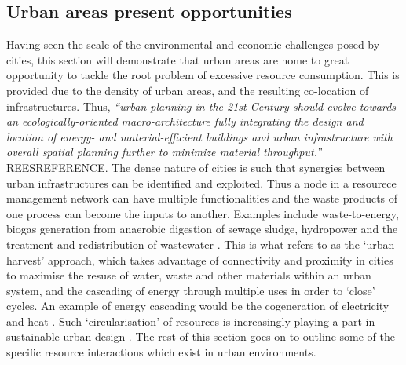 \subsection{Urban areas present opportunities}
Having seen the scale of the environmental and economic challenges posed by cities, this section will demonstrate that urban areas are home to great opportunity to tackle the root problem of excessive resource consumption. This is provided due to the density of urban areas, and the resulting co-location of infrastructures. Thus, \emph{``urban planning in the 21st Century should evolve towards an ecologically-oriented macro-architecture fully integrating the design and location of energy- and material-efficient buildings and urban infrastructure with overall spatial planning further to minimize material throughput.''} REESREFERENCE. The dense nature of cities is such that synergies between urban infrastructures can be identified and exploited. Thus a node in a resourece management network can have multiple functionalities and the waste products of one process can become the inputs to another. Examples include waste-to-energy, biogas generation from anaerobic digestion of sewage sludge, hydropower and the treatment and redistribution of wastewater \citep{Kharrazi2012}. This is what \citet{Leduc2010} refers to as the `urban harvest' approach, which takes advantage of connectivity and proximity in cities to maximise the resuse of water, waste and other materials within an urban system, and the cascading of energy through multiple uses in order to `close' cycles. An example of energy cascading would be the cogeneration of electricity and heat \citep{Grubler2009}. Such `circularisation' of resources is increasingly playing a part in sustainable urban design \citep{Meijer2011}. The rest of this section goes on to outline some of the specific resource interactions which exist in urban environments.

